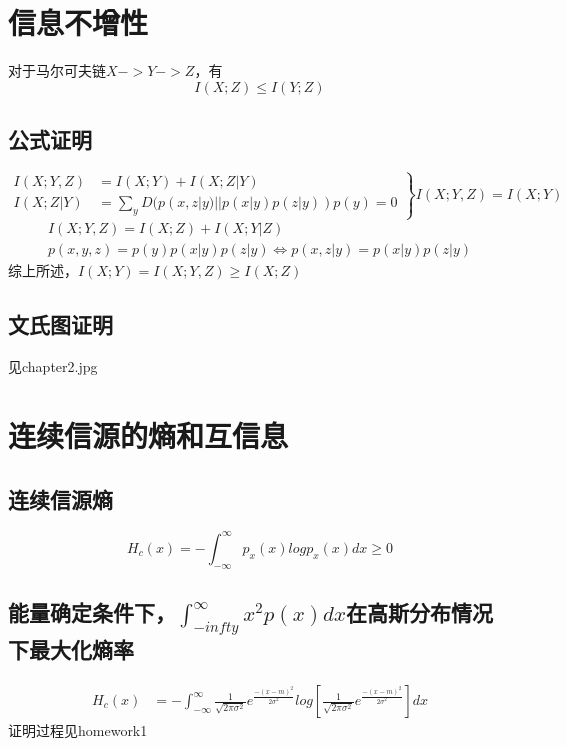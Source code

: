 \documentclass[a4paper, 12pt]{article}
\begin{document}
    \section{信息不增性}
    对于马尔可夫链$X -> Y -> Z$，有
    \[I(X;Z)\le I(Y;Z)\]
    \subsection{公式证明}
    \begin{equation}
        \left.\begin{aligned}
            I(X;Y,Z)&=I(X;Y)+I(X;Z|Y)\\
            I(X;Z|Y)&=\sum_yD(p(x,z|y)||p(x|y)p(z|y))p(y)=0
        \end{aligned}
        \right\}
        I(X;Y,Z)=I(X;Y)
    \end{equation}
    \begin{equation}
        \begin{aligned}
            I(X;Y,Z)=I(X;Z)+I(X;Y|Z)\\
            p(x,y,z)=p(y)p(x|y)p(z|y)\iff p(x,z|y)=p(x|y)p(z|y)
        \end{aligned}
    \end{equation}
    综上所述，$I(X;Y)=I(X;Y,Z)\ge I(X;Z)$
    \subsection{文氏图证明}
    见chapter2.jpg
    \section{连续信源的熵和互信息}
    \subsection{连续信源熵}
    \[H_c(x)=-\int_{-\infty}^{\infty}p_x(x)logp_x(x)dx\ge 0\]
    \subsection{能量确定条件下，$\int_{-infty}^{\infty}x^2p(x)dx$在高斯分布情况下最大化熵率}
    \begin{equation}
        \begin{aligned}
            H_c(x)&=-\int_{-\infty}^{\infty}\frac{1}{\sqrt{2\pi\sigma^2}}e^{\frac{-(x-m)^2}{2\sigma^2}}log[\frac{1}{\sqrt{2\pi\sigma^2}}e^{\frac{-(x-m)^2}{2\sigma^2}}]dx
        \end{aligned}
    \end{equation}
    证明过程见homework1
\end{document}
